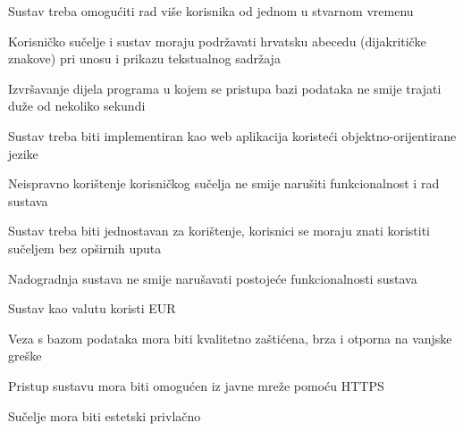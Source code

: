 			\begin{packed_item}
	
						\item Sustav treba omogućiti rad više korisnika od jednom u stvarnom vremenu
						\item Korisničko sučelje i sustav moraju podržavati hrvatsku abecedu (dijakritičke znakove) pri unosu i prikazu tekstualnog sadržaja
						
						\item Izvršavanje dijela programa u kojem se pristupa bazi podataka ne smije trajati duže od nekoliko sekundi
						
						\item Sustav treba biti implementiran kao web aplikacija koristeći objektno-orijentirane jezike
						
						\item Neispravno korištenje korisničkog sučelja ne smije narušiti funkcionalnost i rad sustava
						
						\item Sustav treba biti jednostavan za korištenje, korisnici se moraju znati koristiti sučeljem bez opširnih uputa
						
						\item Nadogradnja sustava ne smije narušavati postojeće funkcionalnosti sustava
						
						\item Sustav kao valutu koristi EUR
						
						\item Veza s bazom podataka mora biti kvalitetno zaštićena, brza i otporna na vanjske greške
						
						\item Pristup sustavu mora biti omogućen iz javne mreže pomoću HTTPS
						\item Sučelje mora biti estetski privlačno
						
					
						
						
						
			\end{packed_item}
			
			 
	
